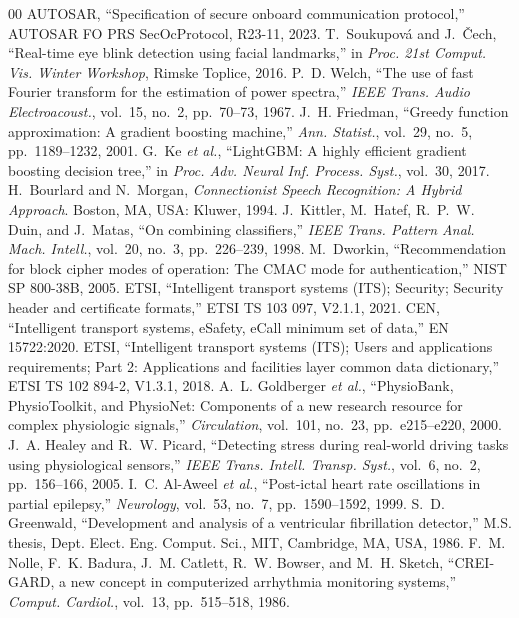 \documentclass[conference]{IEEEtran}
\begin{document}
\begin{thebibliography}{00}
 AUTOSAR, ``Specification of secure onboard communication protocol,'' AUTOSAR FO PRS SecOcProtocol, R23-11, 2023.
 T.~Soukupov\'a and J.~\v{C}ech, ``Real-time eye blink detection using facial landmarks,'' in \emph{Proc. 21st Comput. Vis. Winter Workshop}, Rimske Toplice, 2016.
 P.~D. Welch, ``The use of fast Fourier transform for the estimation of power spectra,'' \emph{IEEE Trans. Audio Electroacoust.}, vol.~15, no.~2, pp.~70--73, 1967.
 J.~H. Friedman, ``Greedy function approximation: A gradient boosting machine,'' \emph{Ann. Statist.}, vol.~29, no.~5, pp.~1189--1232, 2001.
 G.~Ke \emph{et al.}, ``LightGBM: A highly efficient gradient boosting decision tree,'' in \emph{Proc. Adv. Neural Inf. Process. Syst.}, vol.~30, 2017.
 H.~Bourlard and N.~Morgan, \emph{Connectionist Speech Recognition: A Hybrid Approach}. Boston, MA, USA: Kluwer, 1994.
 J.~Kittler, M.~Hatef, R.~P.~W. Duin, and J.~Matas, ``On combining classifiers,'' \emph{IEEE Trans. Pattern Anal. Mach. Intell.}, vol.~20, no.~3, pp.~226--239, 1998.
 M.~Dworkin, ``Recommendation for block cipher modes of operation: The CMAC mode for authentication,'' NIST SP 800-38B, 2005.
 ETSI, ``Intelligent transport systems (ITS); Security; Security header and certificate formats,'' ETSI TS 103 097, V2.1.1, 2021.
 CEN, ``Intelligent transport systems, eSafety, eCall minimum set of data,'' EN 15722:2020.
 ETSI, ``Intelligent transport systems (ITS); Users and applications requirements; Part 2: Applications and facilities layer common data dictionary,'' ETSI TS 102 894-2, V1.3.1, 2018.
 A.~L. Goldberger \emph{et al.}, ``PhysioBank, PhysioToolkit, and PhysioNet: Components of a new research resource for complex physiologic signals,'' \emph{Circulation}, vol.~101, no.~23, pp.~e215--e220, 2000.
 J.~A. Healey and R.~W. Picard, ``Detecting stress during real-world driving tasks using physiological sensors,'' \emph{IEEE Trans. Intell. Transp. Syst.}, vol.~6, no.~2, pp.~156--166, 2005.
 I.~C. Al-Aweel \emph{et al.}, ``Post-ictal heart rate oscillations in partial epilepsy,'' \emph{Neurology}, vol.~53, no.~7, pp.~1590--1592, 1999.
 S.~D. Greenwald, ``Development and analysis of a ventricular fibrillation detector,'' M.S. thesis, Dept. Elect. Eng. Comput. Sci., MIT, Cambridge, MA, USA, 1986.
 F.~M. Nolle, F.~K. Badura, J.~M. Catlett, R.~W. Bowser, and M.~H. Sketch, ``CREI-GARD, a new concept in computerized arrhythmia monitoring systems,'' \emph{Comput. Cardiol.}, vol.~13, pp.~515--518, 1986.

\end{thebibliography}
\end{document}
